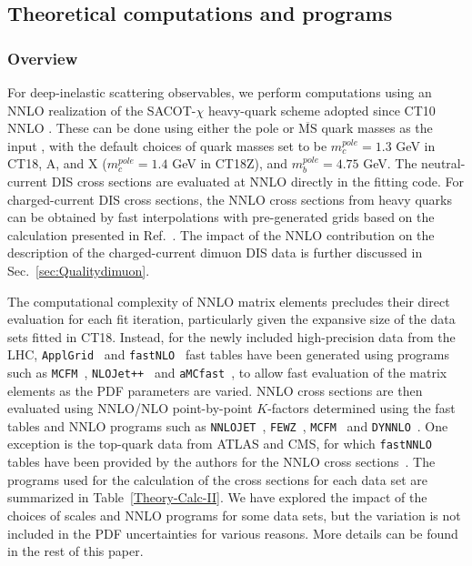 \subsection{Theoretical computations and programs \label{sec:calcs}}
\subsubsection{Overview
\label{sec:TheorySettings}}

For deep-inelastic scattering observables, we perform computations using an NNLO realization \cite{Guzzi:2011ew} of the SACOT-$\chi$ heavy-quark scheme \cite{Aivazis:1993pi,Aivazis:1993kh,Kramer:2000hn,Tung:2001mv} adopted since CT10 NNLO \cite{Gao:2013xoa}. These can be done using either the pole or $\overline{\mathrm{MS}}$ quark masses as the input \cite{Gao:2013wwa}, with the default choices of quark masses set to be $m_c^{pole}=1.3$ GeV in CT18, A, and X ($m_c^{pole}=1.4$ GeV in CT18Z), and $m_b^{pole}=4.75$ GeV.  The neutral-current DIS cross sections are evaluated at NNLO directly in the fitting code. For charged-current DIS cross sections,  the NNLO cross sections from heavy quarks can be obtained by fast interpolations with pre-generated grids based on the calculation presented in Ref.~\cite{Berger:2016inr}. The impact of the NNLO contribution on the description of the charged-current dimuon DIS data is further discussed in Sec.~\ref{sec:Qualitydimuon}.

The computational complexity of NNLO matrix elements precludes their direct evaluation for each fit iteration, particularly given the expansive size of the data sets fitted in CT18. Instead, for the
newly included high-precision data from the LHC, \texttt{ApplGrid}~\cite{Carli:2010rw} and \texttt{fastNLO}~\cite{Wobisch:2011ij} 
fast tables have been generated using programs such as \texttt{MCFM}~\cite{Campbell:2010ff}, \texttt{NLOJet++}~\cite{Nagy:2003tz} and 
\texttt{aMCfast}~\cite{Bertone:2014zva}, to allow fast evaluation of the matrix elements as the PDF parameters are varied. 
NNLO cross sections are then evaluated using NNLO/NLO point-by-point $K$-factors determined using the fast tables and NNLO programs such 
as \texttt{NNLOJET}~\cite{Buza:1997mg,Ridder:2015dxa,Gehrmann-DeRidder:2017mvr,Currie:2016bfm,Currie:2017ctp}, \texttt{FEWZ}~\cite{Gavin:2010az,Gavin:2012sy,Li:2012wna}, 
\texttt{MCFM}~\cite{Campbell:2010ff,Boughezal:2016wmq,MCFM8} and \texttt{DYNNLO}~\cite{Catani:2007vq,Catani:2009sm}. 
One exception is the top-quark data from ATLAS and CMS, for which \texttt{fastNNLO} tables have been 
provided by the authors for the NNLO cross sections~\cite{Czakon:2016dgf,Czakon:2018nun}. The programs used for the calculation of the cross sections for each data set are summarized 
in Table~\ref{Theory-Calc-II}. We have explored the impact of the choices of scales and NNLO programs for some data sets, but the variation is not included in the PDF uncertainties for various reasons. More details can be found in the rest of this paper.

